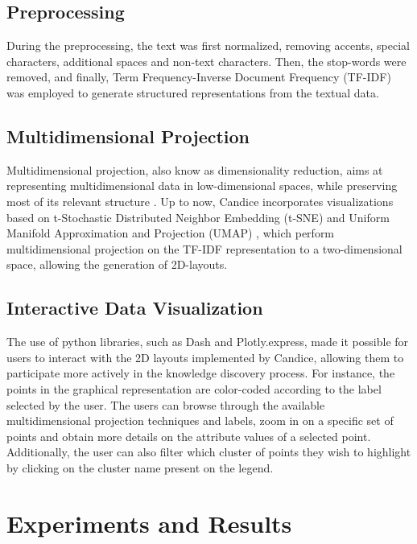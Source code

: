 \documentclass[conference]{IEEEtran}
\begin{document}
\subsection{Preprocessing}

During the preprocessing, the text was first normalized, removing accents, special characters, additional spaces and non-text characters. Then, the stop-words were removed, and finally, Term Frequency-Inverse Document Frequency (TF-IDF) \cite{b9} was employed to generate structured representations from the textual data. 

\subsection{Multidimensional Projection}

Multidimensional projection, also know as dimensionality reduction, aims at representing multidimensional data in low-dimensional spaces, while preserving most of its relevant structure \cite{b10}. Up to now, Candice incorporates visualizations based on t-Stochastic Distributed Neighbor Embedding (t-SNE) \cite{b2} and Uniform Manifold Approximation and Projection (UMAP) \cite{b3}, which perform multidimensional projection on the TF-IDF representation to a two-dimensional space, allowing the generation of 2D-layouts. 

\subsection{Interactive Data Visualization}

The use of python libraries, such as Dash and Plotly.express, made it possible for users to interact with the 2D layouts implemented by Candice, allowing them to participate more actively in the knowledge discovery process. For instance, the points in the graphical representation are color-coded according to the label selected by the user. The users can browse through the available multidimensional projection techniques and labels, zoom in on a specific set of points and obtain more details on the attribute values of a selected point. Additionally, the user can also filter which cluster of points they wish to highlight by clicking on the cluster name present on the legend.

\section{Experiments and Results}
\end{document}
